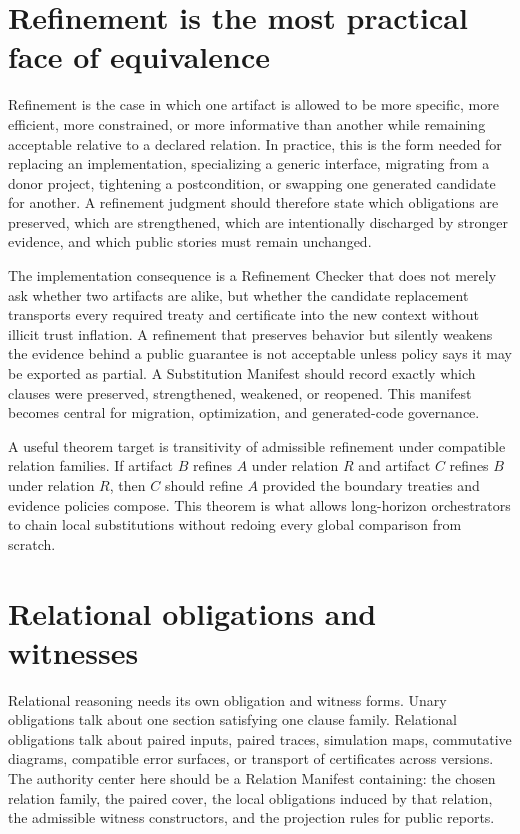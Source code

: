 \documentclass[11pt]{report}
\begin{document}
\section{Refinement is the most practical face of equivalence}
Refinement is the case in which one artifact is allowed to be more specific, more efficient, more constrained, or more informative than another while remaining acceptable relative to a declared relation. In practice, this is the form needed for replacing an implementation, specializing a generic interface, migrating from a donor project, tightening a postcondition, or swapping one generated candidate for another. A refinement judgment should therefore state which obligations are preserved, which are strengthened, which are intentionally discharged by stronger evidence, and which public stories must remain unchanged.

The implementation consequence is a Refinement Checker that does not merely ask whether two artifacts are alike, but whether the candidate replacement transports every required treaty and certificate into the new context without illicit trust inflation. A refinement that preserves behavior but silently weakens the evidence behind a public guarantee is not acceptable unless policy says it may be exported as partial. A Substitution Manifest should record exactly which clauses were preserved, strengthened, weakened, or reopened. This manifest becomes central for migration, optimization, and generated-code governance.

A useful theorem target is transitivity of admissible refinement under compatible relation families. If artifact $B$ refines $A$ under relation $R$ and artifact $C$ refines $B$ under relation $R$, then $C$ should refine $A$ provided the boundary treaties and evidence policies compose. This theorem is what allows long-horizon orchestrators to chain local substitutions without redoing every global comparison from scratch.
\section{Relational obligations and witnesses}
Relational reasoning needs its own obligation and witness forms. Unary obligations talk about one section satisfying one clause family. Relational obligations talk about paired inputs, paired traces, simulation maps, commutative diagrams, compatible error surfaces, or transport of certificates across versions. The authority center here should be a Relation Manifest containing: the chosen relation family, the paired cover, the local obligations induced by that relation, the admissible witness constructors, and the projection rules for public reports.
\end{document}
